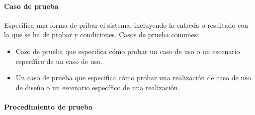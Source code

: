 \paragraph{Caso de prueba}
Especifica una forma de pribar el sistema, incluyendo la entreda o resultado con la que se ha de probar y condiciones. Casos de prueba comunes:
\begin{itemize}
	\item Caso de prueba que especifica cómo probar un caso de uso o un escenario específico de un caso de uso.
	\item Un caso de prueba que especifica cómo probar una realización de caso de uso de diseño o un escenario específico de una realización.
\end{itemize}
\paragraph{Procedimiento de prueba}
